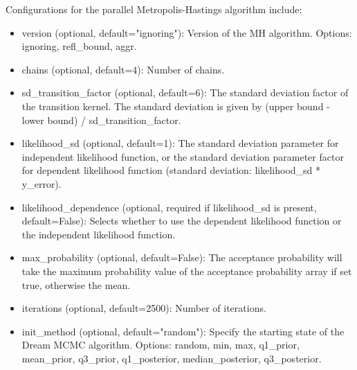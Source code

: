 Configurations for the parallel Metropolis-Hastings algorithm include:
\begin{itemize}
    \item version (optional, default="ignoring"): Version of the MH algorithm. Options: ignoring, refl\_bound, aggr.
    \item chains (optional, default=4): Number of chains.
    \item sd\_transition\_factor (optional, default=6): The
    standard deviation factor of the transition kernel. The standard deviation is given by (upper bound - lower bound) / sd\_transition\_factor.
    \item likelihood\_sd (optional, default=1): The standard deviation parameter for independent likelihood function, or the standard deviation parameter factor for dependent likelihood function (standard deviation: likelihood\_sd * y\_error).
    \item likelihood\_dependence (optional, required if likelihood\_sd is present, default=False): Selects whether to use the dependent likelihood function or the independent likelihood function.
    \item max\_probability (optional, default=False): The acceptance probability will take the maximum probability value of the acceptance probability array if set true, otherwise the mean.
    \item iterations (optional, default=2500): Number of iterations.
    \item init\_method (optional, default="random"): Specify the starting state of the Dream MCMC algorithm. Options: random, min, max, q1\_prior, mean\_prior, q3\_prior, q1\_posterior, median\_posterior, q3\_posterior.
\end{itemize}

